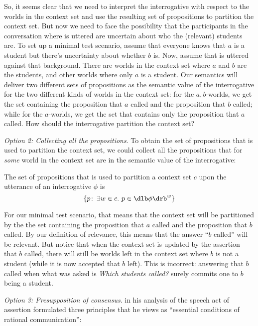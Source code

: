 So, it seems clear that we need to interpret the interrogative with respect to
the worlds in the context set and use the resulting set of propositions to
partition the context set. But now we need to face the possibility that the
participants in the conversation where \Last is uttered are uncertain about who
the (relevant) students are. To set up a minimal test scenario, assume that
everyone knows that $a$ is a student but there's uncertainty about whether $b$
is. Now, assume that \Last is uttered against that background. There are worlds
in the context set where $a$ and $b$ are the students, and other worlds where
only $a$ is a student. Our semantics will deliver two different sets of
propositions as the semantic value of the interrogative for the two different
kinds of worlds in the context set: for the $a,b$-worlds, we get the set
containing the proposition that $a$ called and the proposition that $b$ called;
while for the $a$-worlds, we get the set that contains only the proposition that
$a$ called. How should the interrogative partition the context set?

\emph{Option 2: Collecting all the propositions}. To obtain the set of
propositions that is used to partition the context set, we could collect all the
propositions that for \emph{some} world in the context set are in the semantic
value of the interrogative:

\ex The set of propositions that is used to partition a context set $c$ upon
the utterance of an interrogative $\phi$ is
\[\{p\co \exists w\in c.\ p\in\sv{\phi}^w\}\]
\xe

For our minimal test scenario, that means that the context set will be
partitioned by the the set containing the proposition that $a$ called and the
proposition that $b$ called. By our definition of relevance, this means that the
answer ``$b$ called'' will be relevant. But notice that when the context set is
updated by the assertion that $b$ called, there will still be worlds left in the
context set where $b$ is not a student (while it is now accepted that $b$ left).
This is incorrect: answering that $b$ called when what was asked is \emph{Which
  students called?} surely commits one to $b$ being a student.

\emph{Option 3: Presupposition of consensus}. \cite{stalnaker-1978-assertion} in
his analysis of the speech act of assertion formulated three principles that he
views as ``essential conditions of rational communication'':

